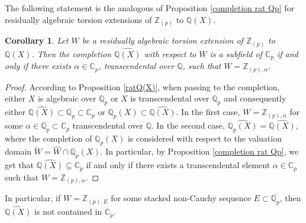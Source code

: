 \documentclass[10pt]{article}
\numberwithin{equation}{section}
\newtheorem{Cor}[equation]{Corollary}
\theoremstyle{definition}\newtheorem{Def}[equation]{Definition}
\theoremstyle{definition}\newtheorem{Ques}[equation]{Question}
\newcommand{\Q}{\mathbb{Q}}
\newcommand{\Z}{\mathbb{Z}}
\newcommand{\C}{\mathbb{C}}
\newcommand{\oQp}{\overline{\Q_p}}
\newcommand{\wW}{\widetilde{W}}
\begin{document}
The following statement is the analogous of Proposition \ref{completion rat Qp} for residually algebraic torsion extensions of $\Z_{(p)}$ to $\Q(X)$.
\begin{Cor}\label{completion rat Q}
Let $W$ be a residually algebraic torsion extension of $\Z_{(p)}$ to $\Q(X)$. Then the completion $\widehat{\Q(X)}$ with respect to $W$ is a subfield of $\C_p$ if and only if  there exists $\alpha\in\C_p$, transcendental over $\Q$, such that $W=\Z_{(p),\alpha}$.
\end{Cor}
\begin{proof}
According to Proposition \ref{ratQ(X)}, when passing to the completion, either $X$ is algebraic over $\Q_p$ or $X$ is transcendental over $\Q_p$ and consequently either $\widehat{\Q(X)}\subset\oQp\subset\C_p$ or $\Q_p(X)\subset\widehat{\Q(X)}$. In the first case, $W=\Z_{(p),\alpha}$ for some $\alpha\in\oQp\subset\C_p$ transcendental over $\Q$. In the second case, $\widehat{\Q_p(X)}=\widehat{\Q(X)}$, where the completion of $\Q_p(X)$ is considered with respect to the valuation domain $\wW=\widehat{W}\cap\Q_p(X)$. In particular, by Proposition \ref{completion rat Qp}, we get that $\widehat{\Q(X)}\subseteq\C_p$ if and only if there exists a transcendental element $\alpha\in\C_p$ such that $W=\Z_{(p),\alpha}$.
\end{proof}

In particular, if $W=\Z_{(p),E}$ for some stacked non-Cauchy sequence $E\subset\oQp$, then $\widehat{\Q(X)}$ is not contained in $\C_p$.
\end{document}
